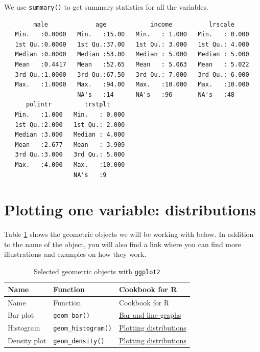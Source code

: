 \documentclass[12pt,oneside]{reedthesis}
\theoremstyle{definition}
\theoremstyle{definition}
\theoremstyle{definition}
\theoremstyle{remark}
\begin{document}
  We use \texttt{summary()} to get summary statistics for all the
  variables.
  \begin{Shaded}
  \begin{Highlighting}[]
  \end{Highlighting}
  \end{Shaded}
  \begin{verbatim}
        male             age            income          lrscale      
   Min.   :0.0000   Min.   :15.00   Min.   : 1.000   Min.   : 0.000  
   1st Qu.:0.0000   1st Qu.:37.00   1st Qu.: 3.000   1st Qu.: 4.000  
   Median :0.0000   Median :53.00   Median : 5.000   Median : 5.000  
   Mean   :0.4417   Mean   :52.65   Mean   : 5.063   Mean   : 5.022  
   3rd Qu.:1.0000   3rd Qu.:67.50   3rd Qu.: 7.000   3rd Qu.: 6.000  
   Max.   :1.0000   Max.   :94.00   Max.   :10.000   Max.   :10.000  
                    NA's   :14      NA's   :96       NA's   :48      
      polintr         trstplt      
   Min.   :1.000   Min.   : 0.000  
   1st Qu.:2.000   1st Qu.: 2.000  
   Median :3.000   Median : 4.000  
   Mean   :2.677   Mean   : 3.909  
   3rd Qu.:3.000   3rd Qu.: 5.000  
   Max.   :4.000   Max.   :10.000  
                   NA's   :9       
  \end{verbatim}
  \section{Plotting one variable:
  distributions}\label{plotting-one-variable-distributions}
  
  Table \ref{tab:distributions} shows the geometric objects we will be
  working with below. In addition to the name of the object, you will also
  find a link where you can find more illustrations and examples on how
  they work.
  \begin{longtable}[]{@{}lll@{}}
  \caption{\label{tab:distributions} Selected geometric objects with
  \texttt{ggplot2}}\tabularnewline
  \toprule
  Name & Function & Cookbook for R\tabularnewline
  \midrule
  \endfirsthead
  \toprule
  Name & Function & Cookbook for R\tabularnewline
  \midrule
  \endhead
  Bar plot & \texttt{geom\_bar()} &
  \href{http://www.cookbook-r.com/Graphs/Bar_and_line_graphs_(ggplot2)/}{Bar
  and line graphs}\tabularnewline
  Histogram & \texttt{geom\_histogram()} &
  \href{http://www.cookbook-r.com/Graphs/Plotting_distributions_(ggplot2)/}{Plotting
  distributions}\tabularnewline
  Density plot & \texttt{geom\_density()} &
  \href{http://www.cookbook-r.com/Graphs/Plotting_distributions_(ggplot2)/}{Plotting
  distributions}\tabularnewline
  \bottomrule
  \end{longtable}
\end{document}
